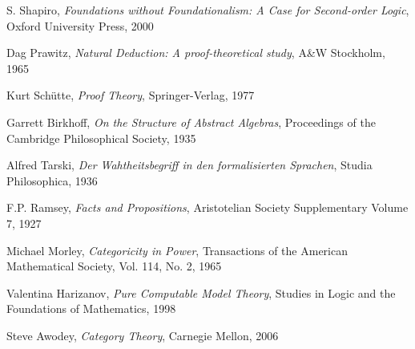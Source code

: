 \documentclass{article}
\begin{document}
\begin{thebibliography}{99}
    S. Shapiro,
    \emph{Foundations without Foundationalism: A Case for Second-order
    Logic},
    Oxford University Press,
    2000

    Dag Prawitz,
    \emph{Natural Deduction: A proof-theoretical study},
    A\&W Stockholm,
    1965

    Kurt Sch\"utte,
    \emph{Proof Theory},
    Springer-Verlag,
    1977

    Garrett Birkhoff,
    \emph{On the Structure of Abstract Algebras},
    Proceedings of the Cambridge Philosophical Society,
    1935

    Alfred Tarski,
    \emph{Der Wahtheitsbegriff in den formalisierten Sprachen},
    Studia Philosophica,
    1936

    F.P. Ramsey,
    \emph{Facts and Propositions},
    Aristotelian Society Supplementary Volume 7,
    1927

    Michael Morley,
    \emph{Categoricity in Power},
    Transactions of the American Mathematical Society, Vol. 114, No. 2,
    1965

    Valentina Harizanov,
    \emph{Pure Computable Model Theory},
    Studies in Logic and the Foundations of Mathematics,
    1998

    Steve Awodey,
    \emph{Category Theory},
    Carnegie Mellon,
    2006

\end{thebibliography}

\end{document}
